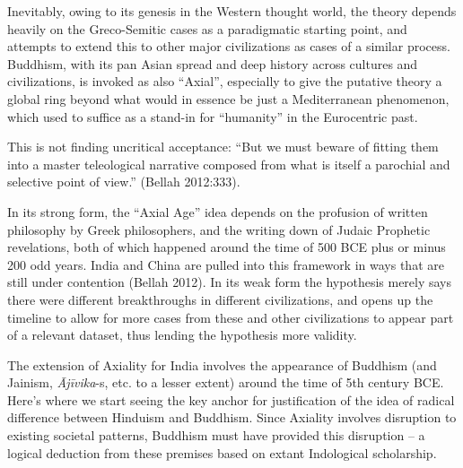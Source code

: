 Inevitably, owing to its genesis in the Western thought world, the theory depends heavily on the Greco-Semitic cases as a paradigmatic starting point, and attempts to extend this to other major civilizations as cases of a similar process. Buddhism, with its pan Asian spread and deep history across cultures and civilizations, is invoked as also “Axial”, especially to give the putative theory a global ring beyond what would in essence be just a Mediterranean phenomenon, which used to suffice as a stand-in for “humanity” in the Eurocentric past.

This is not finding uncritical acceptance: “But we must beware of fitting them into a master teleological narrative composed from what is itself a parochial and selective point of view.” (Bellah 2012:333).

In its strong form, the “Axial Age” idea depends on the profusion of written philosophy by Greek philosophers, and the writing down of Judaic Prophetic revelations, both of which happened around the time of 500 BCE plus or minus 200 odd years. India and China are pulled into this framework in ways that are still under contention (Bellah 2012). In its weak form the hypothesis merely says there were different breakthroughs in different civilizations, and opens up the timeline to allow for more cases from these and other civilizations to appear part of a relevant dataset, thus lending the hypothesis more validity.

The extension of Axiality for India involves the appearance of Buddhism (and Jainism, \textit{Ājīvika}-s, etc. to a lesser extent) around the time of 5th century BCE. Here’s where we start seeing the key anchor for justification of the idea of radical difference between Hinduism and Buddhism. Since Axiality involves disruption to existing societal patterns, Buddhism must have provided this disruption – a logical deduction from these premises based on extant Indological scholarship.


